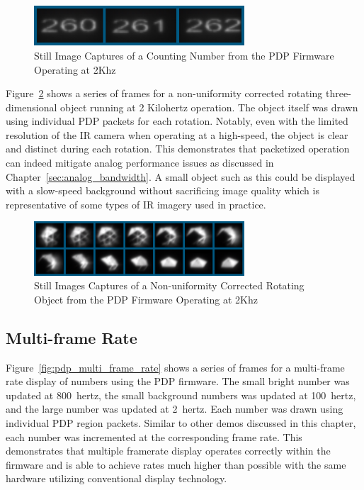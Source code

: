         \begin{figure}[t]
            \centering
            \includegraphics[width=0.7\textwidth]{fig/high_speed_numbers.png}
            \caption{Still Image Captures of a Counting Number from the PDP Firmware Operating at 2Khz}
            \label{fig:high_speed_numbers}
        \end{figure}

        Figure~\ref{fig:high_speed_rotating_object} shows a series of frames for a non-uniformity corrected rotating three-dimensional object running at {2 Kilohertz} operation. The object itself was drawn using individual PDP packets for each rotation. Notably, even with the limited resolution of the IR camera when operating at a high-speed, the object is clear and distinct during each rotation. This demonstrates that packetized operation can indeed mitigate analog performance issues as discussed in Chapter~\ref{sec:analog_bandwidth}. A small object such as this could be displayed with a slow-speed background without sacrificing image quality which is representative of some types of IR imagery used in practice.

        \begin{figure}[t]
            \centering
            \includegraphics[width=0.7\textwidth]{fig/high_speed_rotating_object.png}
            \caption{Still Images Captures of a Non-uniformity Corrected Rotating Object from the PDP Firmware Operating at 2Khz}
            \label{fig:high_speed_rotating_object}
        \end{figure}

    \subsection{Multi-frame Rate}
        Figure~\ref{fig:pdp_multi_frame_rate} shows a series of frames for a multi-frame rate display of numbers using the PDP firmware. The small bright number was updated at \mbox{800 hertz}, the small background numbers was updated at \mbox{100 hertz}, and the large number was updated at \mbox{2 hertz}. Each number was drawn using individual PDP region packets. Similar to other demos discussed in this chapter, each number was incremented at the corresponding frame rate. This demonstrates that multiple framerate display operates correctly within the firmware and is able to achieve rates much higher than possible with the same hardware utilizing conventional display technology.

